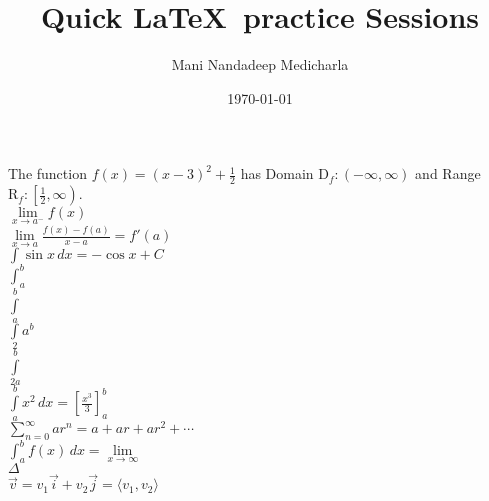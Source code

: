 \documentclass[11pt,a4paper]{article}
\begin{document}
\title{Quick \LaTeX \ practice Sessions}
\author{Mani Nandadeep Medicharla}
\date{\today}
\maketitle

The function $f(x)=(x-3)^2+\frac{1}{2}$ has Domain $\mathrm{D}_f:(-\infty,\infty)$ and
Range $\mathrm{R}_f:\left[\frac{1}{2},\infty\right)$.\\

$\lim\limits_{x \to a^-}f(x)$\\

$\displaystyle{\lim\limits_{x \to a}\frac{f(x)-f(a)}{x-a}=f'(a)}$\\

$\displaystyle{\int \sin x \,dx=-\cos x + C}$\\

$\displaystyle{\int_a^b}$\\

$\displaystyle{\int\limits_a^b}$\\

$\displaystyle{\int\limits_2a^b}$\\

$\displaystyle{\int\limits_{2a}^{b}}$\\

$\displaystyle{\int\limits_{a}^{b} x^2 \,dx=\left[\frac{x^3}{3}\right]_a^b}$\\

$\displaystyle{\sum_{n=0}^{\infty}ar^n=a+ar+ar^2+ \cdots}$\\

$\displaystyle{\int_a^b f(x) \,dx=\lim \limits_{x \to \infty}}$\\

$\Delta$\\

$\vec{v}=v_1 \vec{i} + v_2 \vec{j} =\langle v_1, v_2 \rangle$
\end{document}
